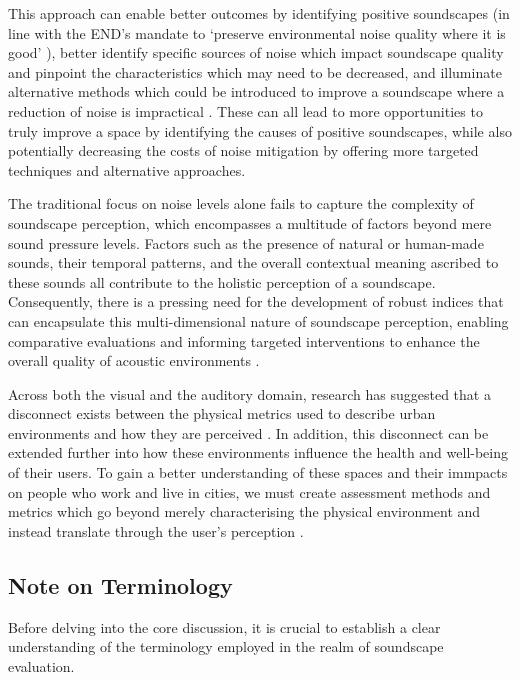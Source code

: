 \documentclass[
  authoryear,
  preprint,
  3p]{elsarticle}
\begin{document}
This approach can enable better outcomes by identifying positive
soundscapes (in line with the END's mandate to `preserve environmental
noise quality where it is good' \citep{EuropeanUnion2002Directive}),
better identify specific sources of noise which impact soundscape
quality and pinpoint the characteristics which may need to be decreased,
and illuminate alternative methods which could be introduced to improve
a soundscape where a reduction of noise is impractical
\citep{Fiebig2018Does, Kang2018Impact}. These can all lead to more
opportunities to truly improve a space by identifying the causes of
positive soundscapes, while also potentially decreasing the costs of
noise mitigation by offering more targeted techniques and alternative
approaches.

The traditional focus on noise levels alone fails to capture the
complexity of soundscape perception, which encompasses a multitude of
factors beyond mere sound pressure levels. Factors such as the presence
of natural or human-made sounds, their temporal patterns, and the
overall contextual meaning ascribed to these sounds all contribute to
the holistic perception of a soundscape. Consequently, there is a
pressing need for the development of robust indices that can encapsulate
this multi-dimensional nature of soundscape perception, enabling
comparative evaluations and informing targeted interventions to enhance
the overall quality of acoustic environments
\citep{Chen2024Interventions}.

Across both the visual and the auditory domain, research has suggested
that a disconnect exists between the physical metrics used to describe
urban environments and how they are perceived
\citep{Kruize2019Exploring, Yang2005Acoustic}. In addition, this
disconnect can be extended further into how these environments influence
the health and well-being of their users. To gain a better understanding
of these spaces and their immpacts on people who work and live in
cities, we must create assessment methods and metrics which go beyond
merely characterising the physical environment and instead translate
through the user's perception \citep{Mitchell2022Predictive}.

\subsection{Note on Terminology}\label{note-on-terminology}

Before delving into the core discussion, it is crucial to establish a
clear understanding of the terminology employed in the realm of
soundscape evaluation.
\end{document}
